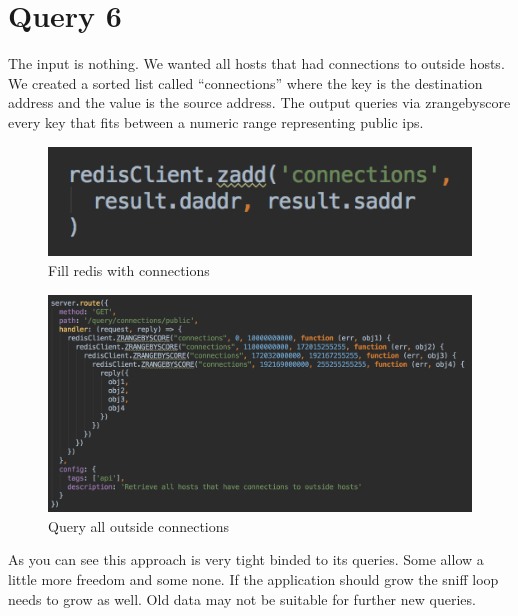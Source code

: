 \section{Query 6}
The input is nothing. We wanted all hosts that had connections to outside hosts. We created a sorted list called “connections” where the key is the destination address and the value is the source address. The output queries via zrangebyscore every key that fits between a numeric range representing public ips.

  \begin{figure}[htb!]
	\centerline{\includegraphics[width=1.0\textwidth]{resources/solution2-12.png}}
	\caption{Fill redis with connections}
	\label{query6}
\end{figure}

\begin{figure}[htb!]
	\centerline{\includegraphics[width=1.0\textwidth]{resources/solution2-13.png}}
	\caption{Query all outside connections}
	\label{query66}
\end{figure}

As you can see this approach is very tight binded to its queries. Some allow a little more freedom and some none. If the application should grow the sniff loop needs to grow as well. Old data may not be suitable for further new queries.

